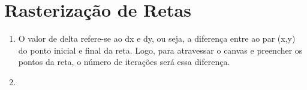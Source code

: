 \section*{Rasterização de Retas}

	\begin{enumerate}\addtocounter{enumi}{5}
		\item 
		
		O valor de delta refere-se ao dx e dy, ou seja, a diferença entre ao par (x,y) do
		ponto inicial e final da reta. Logo, para atravessar o canvas e preencher os pontos
		da reta, o número de iterações será essa diferença.
		
		\item 
	\end{enumerate}


\newpage